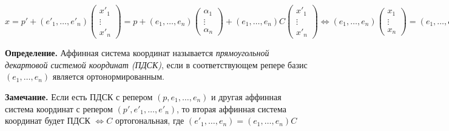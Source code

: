 $x = p' + (e'_1, \dots, e'_n) \begin{pmatrix} x'_1 \\ \vdots \\ x'_n \end{pmatrix} = p + (e_1, \dots, e_n) \begin{pmatrix} \alpha_1 \\ \vdots \\ \alpha_n \end{pmatrix} + (e_1, \dots, e_n) C \begin{pmatrix} x'_1 \\ \vdots \\ x'_n \end{pmatrix} \Leftrightarrow (e_1, \dots, e_n) \begin{pmatrix} x_1 \\ \vdots \\ x_n \end{pmatrix} = (e_1, \dots, e_n) \left(C \begin{pmatrix} x'_1 \\ \vdots \\ x'_n \end{pmatrix} + \begin{pmatrix} \alpha_1 \\ \vdots \\ \alpha_n \end{pmatrix}\right) \Rightarrow \begin{pmatrix} x_1 \\ \vdots \\ x_n \end{pmatrix} = C \begin{pmatrix} x'_1 \\ \vdots \\ x'_n \end{pmatrix} + \begin{pmatrix} \alpha_1 \\ \vdots \\ \alpha_n \end{pmatrix} \ \lhd$

\bigskip
\textbf{Определение.} Аффинная система координат называется \textit{прямоугольной декартовой системой координат (ПДСК)}, если в соответствующем репере базис $(e_1, \dots, e_n)$ является ортонормированным.

\bigskip
\textbf{Замечание.} Если есть ПДСК с репером $(p, e_1, \dots, e_n)$ и другая аффинная система координат с репером $(p', e'_1, \dots, e'_n)$, то вторая аффинная система координат будет ПДСК $\Leftrightarrow C$ ортогональная, где $(e'_1, \dots, e_n) = (e_1, \dots, e_n) C$

